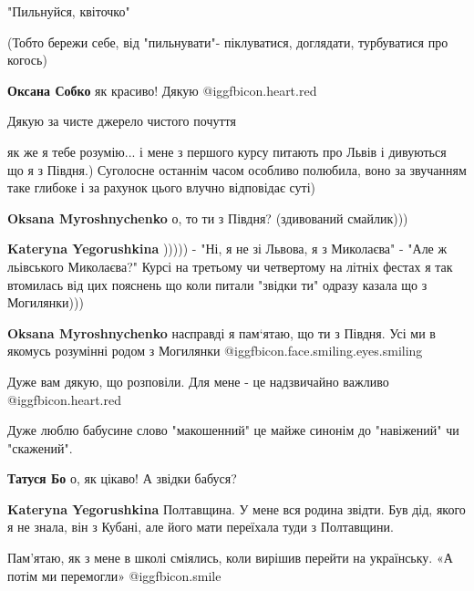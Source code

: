 \begin{itemize}
"Пильнуйся, квіточко"

(Тобто бережи себе, від "пильнувати"- піклуватися, доглядати, турбуватися про
когось)

\begin{itemize} %
\textbf{Оксана Собко} як красиво! Дякую @igg{fbicon.heart.red}
\end{itemize} %

Дякую за чисте джерело чистого почуття

як же я тебе розумію...
і мене з першого курсу питають про Львів і дивуються що я з Півдня.)
Суголосне останнім часом особливо полюбила, воно за звучанням таке глибоке і за рахунок цього влучно відповідає суті)

\begin{itemize} %
\textbf{Oksana Myroshnychenko} о, то ти з Півдня? (здивований смайлик)))

\textbf{Kateryna Yegorushkina} 
))))) - "Ні, я не зі Львова, я з Миколаєва" - "Але ж льівського Миколаєва?"
Курсі на третьому чи четвертому на літніх фестах я так
втомилась від цих пояснень що коли питали "звідки ти" одразу
казала що з Могилянки)))

\textbf{Oksana Myroshnychenko} насправді я пам‘ятаю, що ти з Півдня. Усі ми в якомусь розумінні родом з Могилянки @igg{fbicon.face.smiling.eyes.smiling} 
\end{itemize} %

Дуже вам дякую, що розповіли. Для мене - це надзвичайно важливо @igg{fbicon.heart.red}


Дуже люблю бабусине слово "макошенний" це майже синонім до "навіжений" чи "скажений".

\begin{itemize} %
\textbf{Татуся Бо} о, як цікаво! А звідки бабуся?


\textbf{Kateryna Yegorushkina} Полтавщина. У мене вся родина звідти. Був дід, якого я не знала, він з Кубані, але його мати переїхала туди з Полтавщини.
\end{itemize} %

Пам’ятаю, як з мене в школі сміялись, коли вирішив перейти на українську.
«А потім ми перемогли»  @igg{fbicon.smile} 


\end{itemize}
